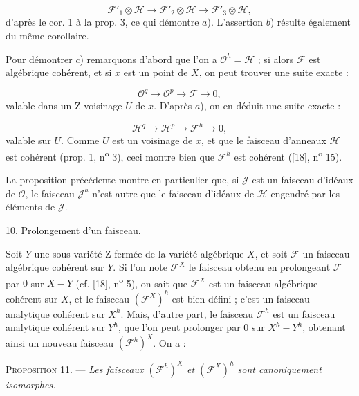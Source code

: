 \begin{equation*}
\mathcal{F}'_1 \otimes \mathcal{H} \to \mathcal{F}'_2 \otimes \mathcal{H} \to \mathcal{F}'_3 \otimes \mathcal{H},
\end{equation*}
d'après le cor. 1 à la prop. 3, ce qui démontre $a$). L'assertion $b$) résulte également du même corollaire.

Pour démontrer $c$) remarquons d'abord que l'on a $\mathcal{O}^h = \mathcal{H}$ ; si alors $\mathcal{F}$ est algébrique cohérent, et si $x$ est un point de $X$, on peut trouver une suite exacte :

\begin{equation*}
\mathcal{O}^q \to \mathcal{O}^p \to \mathcal{F} \to 0,
\end{equation*}
valable dans un Z-voisinage $U$ de $x$. D'après $a$), on en déduit une suite exacte :

\begin{equation*}
\mathcal{H}^q \to \mathcal{H}^p \to \mathcal{F}^h \to 0,
\end{equation*}
valable sur $U$. Comme $U$ est un voisinage de $x$, et que le faisceau d'anneaux $\mathcal{H}$ est cohérent (prop. 1, n\textsuperscript{o} 3), ceci montre bien que $\mathcal{F}^h$ est cohérent ([18], n\textsuperscript{o} 15).

La proposition précédente montre en particulier que, si $\mathcal{J}$ est un faisceau d'idéaux de $\mathcal{O}$, le faisceau $\mathcal{J}^h$ n'est autre que le faisceau d'idéaux de $\mathcal{H}$ engendré par les éléments de $\mathcal{J}$.


10. Prolongement d'un faisceau.

Soit $Y$ une sous-variété Z-fermée de la variété algébrique $X$, et soit $\mathcal{F}$ un faisceau algébrique cohérent sur $Y$. Si l'on note $\mathcal{F}^X$ le faisceau obtenu en prolongeant $\mathcal{F}$ par $0$ sur $X - Y$ (cf. [18], n\textsuperscript{o} 5), on sait que $\mathcal{F}^X$ est un faisceau algébrique cohérent sur $X$, et le faisceau $(\mathcal{F}^X)^h$ est bien défini ; c'est un faisceau analytique cohérent sur $X^h$. Mais, d'autre part, le faisceau $\mathcal{F}^h$ est un faisceau analytique cohérent sur $Y^h$, que l'on peut prolonger par $0$ sur $X^h - Y^h$, obtenant ainsi un nouveau faisceau $(\mathcal{F}^h)^X$. On a :



\textsc{Proposition} 11. --- \emph{Les faisceaux $(\mathcal{F}^h)^X$ et $(\mathcal{F}^X)^h$ sont canoniquement isomorphes.}

